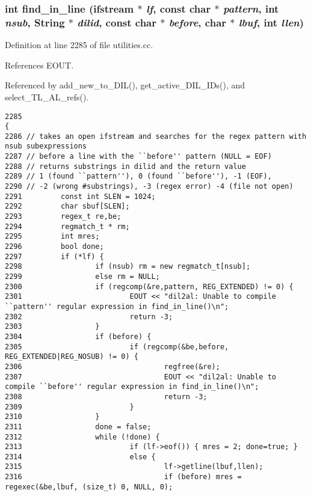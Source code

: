 \subsubsection{\setlength{\rightskip}{0pt plus 5cm}int find\_\-in\_\-line (ifstream $\ast$ {\em lf}, const char $\ast$ {\em pattern}, int {\em nsub}, {\bf String} $\ast$ {\em dilid}, const char $\ast$ {\em before}, char $\ast$ {\em lbuf}, int {\em llen})}\label{dil2al_8hh_a247}




Definition at line 2285 of file utilities.cc.

References EOUT.

Referenced by add\_\-new\_\-to\_\-DIL(), get\_\-active\_\-DIL\_\-IDs(), and select\_\-TL\_\-AL\_\-refs().



\footnotesize\begin{verbatim}2285                                                                                                                             {
2286 // takes an open ifstream and searches for the regex pattern with nsub subexpressions
2287 // before a line with the ``before'' pattern (NULL = EOF)
2288 // returns substrings in dilid and the return value
2289 // 1 (found ``pattern''), 0 (found ``before''), -1 (EOF),
2290 // -2 (wrong #substrings), -3 (regex error) -4 (file not open)
2291         const int SLEN = 1024;
2292         char sbuf[SLEN];
2293         regex_t re,be;
2294         regmatch_t * rm;
2295         int mres;
2296         bool done;
2297         if (*lf) {
2298                 if (nsub) rm = new regmatch_t[nsub];
2299                 else rm = NULL;
2300                 if (regcomp(&re,pattern, REG_EXTENDED) != 0) {
2301                         EOUT << "dil2al: Unable to compile ``pattern'' regular expression in find_in_line()\n";
2302                         return -3;
2303                 }
2304                 if (before) {
2305                         if (regcomp(&be,before, REG_EXTENDED|REG_NOSUB) != 0) {
2306                                 regfree(&re);
2307                                 EOUT << "dil2al: Unable to compile ``before'' regular expression in find_in_line()\n";
2308                                 return -3;
2309                         }
2310                 }
2311                 done = false;
2312                 while (!done) {
2313                         if (lf->eof()) { mres = 2; done=true; }
2314                         else {
2315                                 lf->getline(lbuf,llen);
2316                                 if (before) mres = regexec(&be,lbuf, (size_t) 0, NULL, 0);

\end{verbatim}

